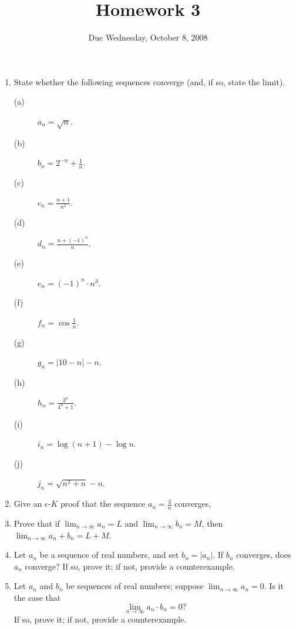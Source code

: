 \documentclass[12pt]{article}
\title{Homework 3}
\date{Due Wednesday, October 8, 2008}
\begin{document}
\maketitle

\begin{enumerate}

\item State whether the following sequences converge (and, if so,
  state the limit).

\begin{description}
\item[(a)] $a_n = \sqrt{n}$.
\vfill
\item[(b)] $b_n = 2^{-n} + \frac{1}{n}$.
\vfill
\item[(c)] $c_n = \displaystyle\frac{n+1}{n^2}$.
\vfill
\item[(d)] $d_n = \displaystyle\frac{n + (-1)^n}{n}$.
\vfill
\item[(e)] $e_n = (-1)^n \cdot n^3$.
\vfill
\item[(f)] $f_n = \cos \displaystyle\frac{1}{n}$.
\vfill
\item[(g)] $g_n = \left|10 - n\right| - n$.
\vfill
\item[(h)] $h_n = \displaystyle\frac{3^n}{4^n + 1}$.
\vfill
\item[(i)] $i_n = \log \left(n+1\right) - \log n$.
\vfill
\item[(j)] $j_n = \sqrt{n^2 + n} - n$.
\vfill
\end{description}

\item Give an $\epsilon$-$K$ proof that the sequence $a_n =
  \displaystyle\frac{3}{n}$ converges,

\item Prove that if $\displaystyle\lim_{n \to \infty} a_n = L$ and
  $\displaystyle\lim_{n \to \infty} b_n = M$, then
  $\displaystyle\lim_{n \to \infty} a_n + b_n = L + M$.

\item Let $a_n$ be a sequence of real numbers, and set $b_n = |a_n|$.
  If $b_n$ converges, does $a_n$ converge?  If so, prove it; if not,
  provide a counterexample.

\item Let $a_n$ and $b_n$ be sequences of real numbers; suppose
  $\displaystyle\lim_{n \to \infty} a_n = 0$.  Is it the case that
$$
\lim_{n \to \infty} a_n \cdot b_n = 0?
$$
If so, prove it; if not, provide a counterexample.

\end{enumerate}
\end{document}
